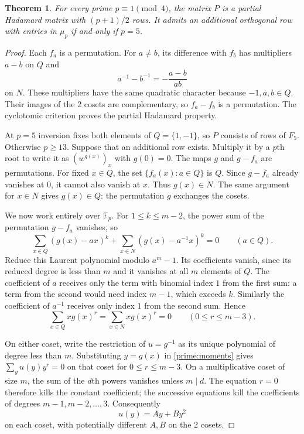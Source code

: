 \documentclass[11pt,a4paper]{article}
\newtheorem{theorem}{Theorem}[section]
\numberwithin{equation}{section}
\begin{document}
\begin{theorem}\label{prime:inverse-obstruction}
For every prime $p\equiv1\pmod4$, the matrix $P$ is a partial Hadamard matrix with $(p+1)/2$ rows. It admits an additional orthogonal row with entries in $\mu_p$ if and only if $p=5$.
\end{theorem}
\begin{proof}
Each $f_a$ is a permutation. For $a\ne b$, its difference with $f_b$ has multipliers $a-b$ on $Q$ and
$$a^{-1}-b^{-1}=-\frac{a-b}{ab}$$
on $N$. These multipliers have the same quadratic character because $-1,a,b\in Q$. Their images of the 2 cosets are complementary, so $f_a-f_b$ is a permutation. The cyclotomic criterion proves the partial Hadamard property.

At $p=5$ inversion fixes both elements of $Q=\{1,-1\}$, so $P$ consists of rows of $F_5$. Otherwise $p\ge13$. Suppose that an additional row exists. Multiply it by a $p$th root to write it as $(w^{g(x)})_x$ with $g(0)=0$. The maps $g$ and $g-f_a$ are permutations. For fixed $x\in Q$, the set $\{f_a(x):a\in Q\}$ is $Q$. Since $g-f_a$ already vanishes at $0$, it cannot also vanish at $x$. Thus $g(x)\in N$. The same argument for $x\in N$ gives $g(x)\in Q$: the permutation $g$ exchanges the cosets.

We now work entirely over $\mathbb F_p$. For $1\le k\le m-2$, the power sum of the permutation $g-f_a$ vanishes, so
\begin{equation}\label{prime:moment-poly}
\sum_{x\in Q}(g(x)-ax)^k+\sum_{x\in N}(g(x)-a^{-1}x)^k=0\qquad(a\in Q).
\end{equation}
Reduce this Laurent polynomial modulo $a^m-1$. Its coefficients vanish, since its reduced degree is less than $m$ and it vanishes at all $m$ elements of $Q$. The coefficient of $a$ receives only the term with binomial index $1$ from the first sum: a term from the second would need index $m-1$, which exceeds $k$. Similarly the coefficient of $a^{-1}$ receives only index $1$ from the second sum. Hence
\begin{equation}\label{prime:moments}
\sum_{x\in Q}xg(x)^r=\sum_{x\in N}xg(x)^r=0\qquad(0\le r\le m-3).
\end{equation}

On either coset, write the restriction of $u=g^{-1}$ as its unique polynomial of degree less than $m$. Substituting $y=g(x)$ in \eqref{prime:moments} gives $\sum_y u(y)y^r=0$ on that coset for $0\le r\le m-3$. On a multiplicative coset of size $m$, the sum of the $d$th powers vanishes unless $m\mid d$. The equation $r=0$ therefore kills the constant coefficient; the successive equations kill the coefficients of degrees $m-1,m-2,\ldots,3$. Consequently
$$u(y)=Ay+By^2$$
on each coset, with potentially different $A,B$ on the 2 cosets.


\end{proof}
\end{document}
